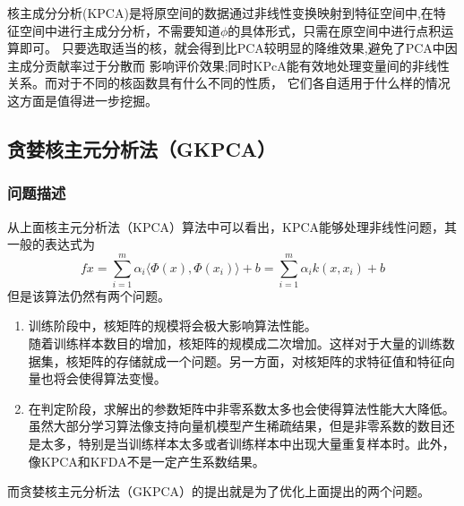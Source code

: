 \documentclass[10pt,a4paper]{article}
\begin{document}
\begin{CJK*}{UTF8}{song}
核主成分分析(KPCA)是将原空间的数据通过非线性变换映射到特征空间中,在特
征空间中进行主成分分析，不需要知道$\phi$的具体形式，只需在原空间中进行点积运算即可。
只要选取适当的核，就会得到比PCA较明显的降维效果,避免了PCA中因主成分贡献率过于分散而
影响评价效果;同时KPcA能有效地处理变量间的非线性关系。而对于不同的核函数具有什么不同的性质，
它们各自适用于什么样的情况这方面是值得进一步挖掘。



\subsection{贪婪核主元分析法（GKPCA）}
\subsubsection{问题描述}
从上面核主元分析法（KPCA）算法中可以看出，KPCA能够处理非线性问题，其一般的表达式为
\begin{equation}
f{x}=\sum_{i=1}^m \alpha_i\langle \Phi(x),\Phi(x_i) \rangle+b
=\sum_{i=1}^m \alpha_i k(x,x_i) +b
\end{equation}
但是该算法仍然有两个问题。
\begin{enumerate}
\item 训练阶段中，核矩阵的规模将会极大影响算法性能。\\
随着训练样本数目的增加，核矩阵的规模成二次增加。这样对于大量的训练数据集，核矩阵的存储就成一个问题。另一方面，对核矩阵的求特征值和特征向量也将会使得算法变慢。
\item 在判定阶段，求解出的参数矩阵中非零系数太多也会使得算法性能大大降低。\\
虽然大部分学习算法像支持向量机模型产生稀疏结果，但是非零系数的数目还是太多，特别是当训练样本太多或者训练样本中出现大量重复样本时。此外，像KPCA和KFDA不是一定产生系数结果。
\end{enumerate}
而贪婪核主元分析法（GKPCA）的提出就是为了优化上面提出的两个问题。



\end{CJK*}
\end{document}
